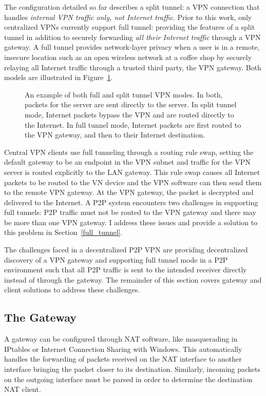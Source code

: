 The configuration detailed so far describes a split tunnel: a VPN connection
that handles \emph{internal VPN traffic only, not Internet traffic}.  Prior to
this work, only centralized VPNs currently support full tunnel: providing the
features of a split tunnel in addition to securely forwarding \emph{all their
Internet traffic} through a VPN gateway.  A full tunnel provides network-layer
privacy when a user is in a remote, insecure location such as an open wireless
network at a coffee shop by securely relaying all Internet traffic through a
trusted third party, the VPN gateway.  Both models are illustrated in
Figure~\ref{fig:tunnel}.

\begin{figure}
\centering
{}
\caption[An example of both full and split tunnel VPN modes]{An example of both
full and split tunnel VPN modes.  In both, packets for the server are sent
directly to the server.  In split tunnel mode, Internet packets bypass the VPN
and are routed directly to the Internet.  In full tunnel mode, Internet packets
are first routed to the VPN gateway, and then to their Internet destination.}
\label{fig:tunnel}
\end{figure}

Central VPN clients use full tunneling through a routing rule swap, setting the
default gateway to be an endpoint in the VPN subnet and traffic for the VPN
server is routed explicitly to the LAN gateway.  This rule swap causes all
Internet packets to be routed to the VN device and the VPN software can then
send them to the remote VPN gateway.  At the VPN gateway, the packet is
decrypted and delivered to the Internet.  A P2P system encounters two
challenges in supporting full tunnels:  P2P traffic must not be routed to the
VPN gateway and there may be more than one VPN gateway.  I address these issues
and provide a solution to this problem in Section~\ref{full_tunnel}.

The challenges faced in a decentralized P2P VPN are providing decentralized
discovery of a VPN gateway and supporting full tunnel mode in a P2P environment
such that all P2P traffic is sent to the intended receiver directly instead of
through the gateway.  The remainder of this section covers gateway and
client solutions to address these challenges.

\subsection{The Gateway}
\label{the_gateway}
A gateway can be configured through NAT software, like masquerading in IPtables
or Internet Connection Sharing with Windows.  This automatically handles the
forwarding of packets received on the NAT interface to another interface
bringing the packet closer to its destination.  Similarly, incoming packets
on the outgoing interface must be parsed in order to determine the destination
NAT client.


